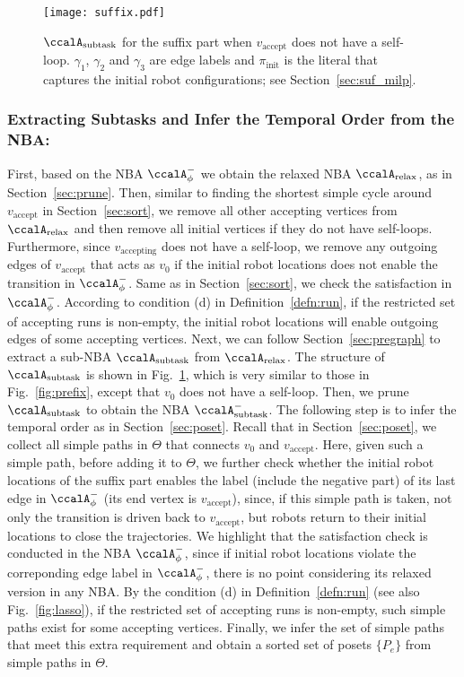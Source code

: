 \documentclass[Afour,sageh,times]{sagej}
\newcommand{\auto}[1]{\ccalA_{\text{#1}}}
\newcommand{\autop}{\ccalA_{\phi}}
\newcommand{\vertex}[1]{v_{\text{#1}}}
\begin{document}
{{  \begin{figure}[!t]
    \centering
    \texttt{[image: suffix.pdf]}
    \caption{$\auto{subtask}$ for the suffix part when $\vertex{accept}$ does not have a self-loop. $\gamma_1$, $\gamma_2$ and $\gamma_3$ are edge labels and $\pi_{\text{init}}$ is the literal that captures the initial robot configurations; see Section~\ref{sec:suf_milp}.}
    \label{fig:suffix}
  \end{figure}

  \subsubsection{Extracting Subtasks and Infer the Temporal Order from the NBA:}\label{sec:suf_prune} First, based on the NBA $\autop^-$ we obtain the relaxed NBA $\auto{relax}$, as in Section~\ref{sec:prune}.  Then, similar to finding the shortest simple cycle around $v_{\text{accept}}$ in Section~\ref{sec:sort}, we remove all other accepting vertices from $\auto{relax}$ and then remove all initial vertices if they do not have self-loops. Furthermore, since $\vertex{accepting}$ does not have a self-loop, we remove any outgoing edges of $\vertex{accept}$ that acts as $v_0$ if the initial robot locations does not enable the transition in $\autop^-$. Same as in Section~\ref{sec:sort}, we check the satisfaction in $\autop^-$. According to condition (d) in Definition~\ref{defn:run}, if the restricted set of accepting runs is non-empty, the initial robot locations will enable outgoing edges of some accepting vertices. Next, we can follow Section~\ref{sec:pregraph} to  extract a sub-NBA $\auto{subtask}$ from $\auto{relax}$. The structure of $\auto{subtask}$ is shown in Fig.~\ref{fig:suffix}, which is very similar to those in Fig.~\ref{fig:prefix}, except that $v_0$ does not have a self-loop.  Then, we prune $\auto{subtask}$ to obtain the NBA $\auto{subtask}^-$. The following step is to infer the temporal order as in Section~\ref{sec:poset}. Recall that in Section~\ref{sec:poset}, we collect all simple paths in $\Theta$ that connects $v_0$ and $\vertex{accept}$. Here, given such a simple path, before adding it to $\Theta$, we further check whether the initial robot locations of the suffix part enables the label (include the negative part) of its last edge in $\autop^-$ (its end vertex is $\vertex{accept}$), since, if this simple path is taken,  not only the transition is driven back to $\vertex{accept}$, but robots return to their initial locations to close the trajectories. We highlight that the satisfaction check is conducted in the NBA $\autop^-$, since if initial robot locations violate the correponding  edge label in $\autop^-$, there is no point considering its relaxed version in any NBA.  By the condition (d) in Definition~\ref{defn:run} (see also Fig.~\ref{fig:lasso}), if the restricted set of accepting runs is non-empty, such simple paths exist for some accepting vertices. Finally, we infer the set of simple paths that meet this extra requirement and  obtain a sorted set of posets $\{P_e\}$ from simple paths in $\Theta$.

}}
\end{document}
